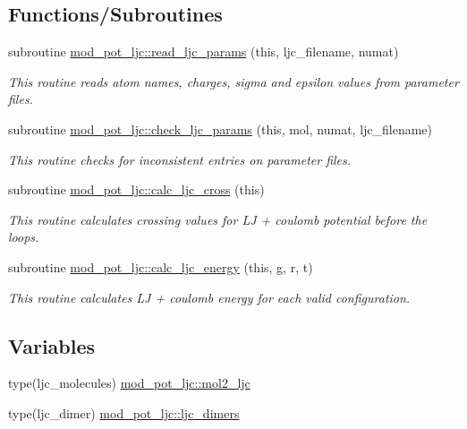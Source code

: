 \subsection*{Functions/\+Subroutines}
\begin{DoxyCompactItemize}
\item 
subroutine \hyperlink{namespacemod__pot__ljc_aba75dd17c928cdddf564bf03d18b3ee2}{mod\+\_\+pot\+\_\+ljc\+::read\+\_\+ljc\+\_\+params} (this, ljc\+\_\+filename, numat)
\begin{DoxyCompactList}\small\item\em This routine reads atom names, charges, sigma and epsilon values from parameter files. \end{DoxyCompactList}\item 
subroutine \hyperlink{namespacemod__pot__ljc_a1bb4a9e2007633f78e818f7f1d8347b5}{mod\+\_\+pot\+\_\+ljc\+::check\+\_\+ljc\+\_\+params} (this, mol, numat, ljc\+\_\+filename)
\begin{DoxyCompactList}\small\item\em This routine checks for inconsistent entries on parameter files. \end{DoxyCompactList}\item 
subroutine \hyperlink{namespacemod__pot__ljc_aea69edf70ec804ebb8075741c84ab50b}{mod\+\_\+pot\+\_\+ljc\+::calc\+\_\+ljc\+\_\+cross} (this)
\begin{DoxyCompactList}\small\item\em This routine calculates crossing values for LJ + coulomb potential before the loops. \end{DoxyCompactList}\item 
subroutine \hyperlink{namespacemod__pot__ljc_ab48e8b4489ee4bd72910cbed5e760a42}{mod\+\_\+pot\+\_\+ljc\+::calc\+\_\+ljc\+\_\+energy} (this, g, r, t)
\begin{DoxyCompactList}\small\item\em This routine calculates LJ + coulomb energy for each valid configuration. \end{DoxyCompactList}\end{DoxyCompactItemize}
\subsection*{Variables}
\begin{DoxyCompactItemize}
\item 
type(ljc\+\_\+molecules) \hyperlink{namespacemod__pot__ljc_a1e6c4de2f430e31de30d11b03267a4d9}{mod\+\_\+pot\+\_\+ljc\+::mol2\+\_\+ljc}
\item 
type(ljc\+\_\+dimer) \hyperlink{namespacemod__pot__ljc_a6c45700ba481536007711306e5c21e0c}{mod\+\_\+pot\+\_\+ljc\+::ljc\+\_\+dimers}
\end{DoxyCompactItemize}
